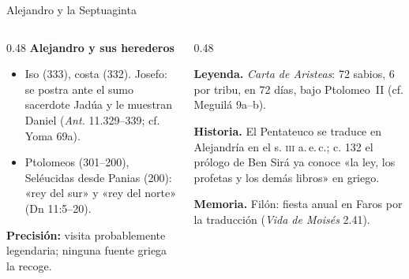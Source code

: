\documentclass[hyperref={bookmarks=false},aspectratio=169]{beamer}
\begin{document}
\begin{frame}{Alejandro y la Septuaginta}
\begin{columns}[T,onlytextwidth]
\begin{column}{0.48\textwidth}\footnotesize
\textbf{\textcolor{ladrillo}{Alejandro y sus herederos}}
\begin{itemize}
\item Iso (333), costa (332). Josefo: se postra ante el sumo sacerdote Jadúa y le muestran Daniel (\emph{Ant.} 11.329--339; cf. Yoma 69a).
\item Ptolomeos (301--200), Seléucidas desde Panias (200): «rey del sur» y «rey del norte» (Dn 11:5--20).
\end{itemize}
\begin{clave}\textbf{Precisión:} visita probablemente legendaria; ninguna fuente griega la recoge.\end{clave}
\end{column}
\begin{column}{0.48\textwidth}
\begin{notalam}
\textbf{Leyenda.} \emph{Carta de Aristeas}: 72 sabios, 6 por tribu, en 72 días, bajo Ptolomeo~II (cf. Meguilá 9a--b).\par\smallskip
\textbf{Historia.} El Pentateuco se traduce en Alejandría en el s. \textsc{iii} a.\,e.\,c.; c. 132 el prólogo de Ben Sirá ya conoce «la ley, los profetas y los demás libros» en griego.\par\smallskip
\textbf{Memoria.} Filón: fiesta anual en Faros por la traducción (\emph{Vida de Moisés} 2.41).
\end{notalam}
\end{column}
\end{columns}
\end{frame}
\end{document}

